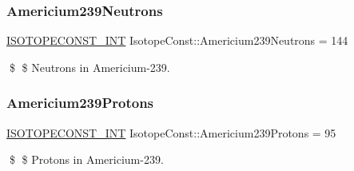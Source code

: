 \subsubsection{\texorpdfstring{Americium239\+Neutrons}{Americium239Neutrons}}
{\footnotesize\ttfamily \mbox{\hyperlink{group___isotope_const-_macros_ga5f18360b3e99483a35c32d789e62621c}{I\+S\+O\+T\+O\+P\+E\+C\+O\+N\+S\+T\+\_\+\+I\+NT}} Isotope\+Const\+::\+Americium239\+Neutrons = 144}

\$ \$ Neutrons in Americium-\/239. \mbox{\label{group___isotope_const-_americium-_am239_ga2e84cc9debc0f1265d3d19b2855d801d}} 
\subsubsection{\texorpdfstring{Americium239\+Protons}{Americium239Protons}}
{\footnotesize\ttfamily \mbox{\hyperlink{group___isotope_const-_macros_ga5f18360b3e99483a35c32d789e62621c}{I\+S\+O\+T\+O\+P\+E\+C\+O\+N\+S\+T\+\_\+\+I\+NT}} Isotope\+Const\+::\+Americium239\+Protons = 95}

\$ \$ Protons in Americium-\/239. 